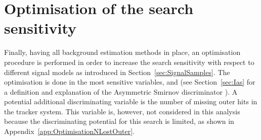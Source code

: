 
\FloatBarrier
\chapter{Optimisation of the search sensitivity}
\label{ch:Optimisation}
Finally, having all background estimation methods in place, an optimisation procedure is performed in order to increase the search sensitivity with respect to different signal models as introduced in Section~\ref{sec:SignalSamples}.
The optimisation is done in the most sensitive variables, \pt and \ias (see Section~\ref{sec:Ias} for a definition and explanation of the Asymmetric Smirnov discriminator \ias).
A potential additional discriminating variable is the number of missing outer hits \nlostouter in the tracker system. 
This variable is, however, not considered in this analysis because the discriminating potential for this search is limited, as shown in Appendix~\ref{app:OptimisationNLostOuter}.\\

